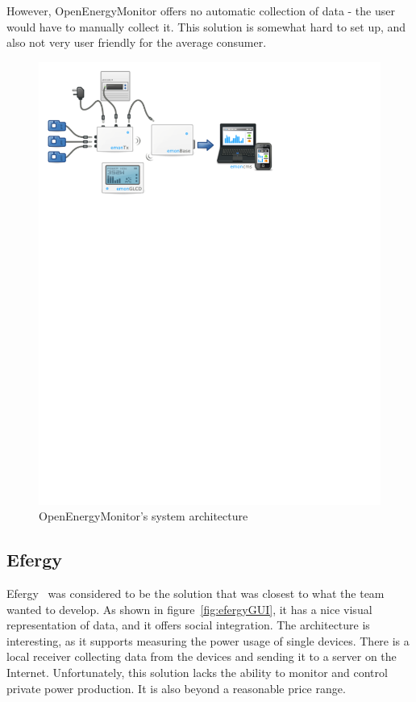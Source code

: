However, OpenEnergyMonitor offers no automatic collection of data - the user would have to manually collect it. This solution is somewhat hard to set up, and also not very user friendly for the average consumer. 

\setcounter{figure}{1}
\begin{figure}[H]
\centering
\includegraphics[width=\textwidth, trim=0.5cm 19cm 6.5cm 0cm, clip]{ch/prestudy/fig/OEM_system.pdf}
\caption{OpenEnergyMonitor's system architecture}
\label{fig:oem}
\end{figure}

\newpage
\subsection{Efergy}

Efergy~\cite{efergy} was considered to be the solution that was closest to what the team wanted to develop. As shown in figure~\ref{fig:efergyGUI}, it has a nice visual representation of data, and it offers social integration. The architecture is interesting, as it supports measuring the power usage of single devices. There is a local receiver collecting data from the devices and sending it to a server on the Internet. Unfortunately, this solution lacks the ability to monitor and control private power production. It is also beyond a reasonable price range.

